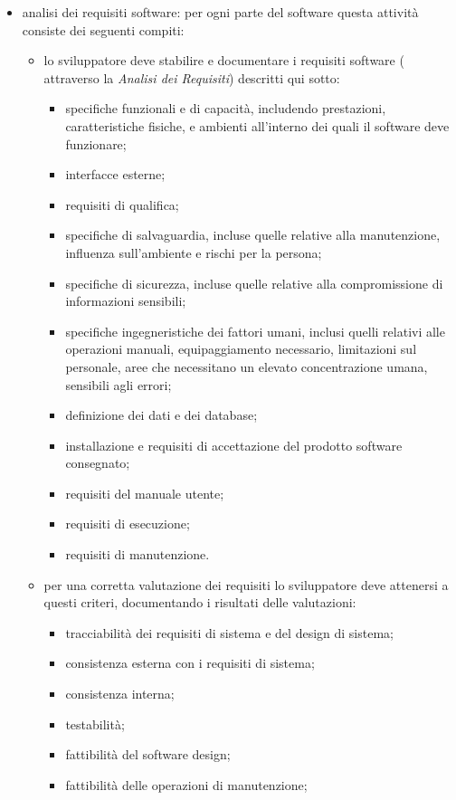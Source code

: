 			\begin{itemize}
			\item analisi dei requisiti software: per ogni parte del software questa attività consiste dei seguenti compiti:
			\begin{itemize}
			\item lo sviluppatore deve stabilire e documentare i requisiti software ( attraverso la \textit{Analisi dei Requisiti}) descritti qui sotto:
			\begin{itemize}
			\item specifiche funzionali e di capacità, includendo prestazioni, caratteristiche fisiche, e ambienti all'interno dei quali il software deve funzionare;
			\item interfacce esterne;
			\item requisiti di qualifica;
			\item specifiche di salvaguardia, incluse quelle relative alla manutenzione, influenza sull'ambiente e rischi per la persona;
			\item specifiche di sicurezza, incluse quelle relative alla compromissione di informazioni sensibili;
			\item specifiche ingegneristiche dei fattori umani, inclusi quelli relativi alle operazioni manuali, equipaggiamento necessario, limitazioni sul personale, aree che necessitano un elevato concentrazione umana, sensibili agli errori;
			\item definizione dei dati e dei database;
			\item installazione e requisiti di accettazione del prodotto software consegnato; 
			\item requisiti del manuale utente;
			\item requisiti di esecuzione;
			\item requisiti di manutenzione.
			\end{itemize}
			\item per una corretta valutazione dei requisiti lo sviluppatore deve attenersi a questi criteri, documentando i risultati delle valutazioni:
			\begin{itemize}
			\item tracciabilità dei requisiti di sistema e del design di sistema;
			\item consistenza esterna con i requisiti di sistema;
			\item consistenza interna;
			\item testabilità;
			\item fattibilità del software design;
			\item fattibilità delle operazioni di manutenzione;
			\end{itemize}
			\end{itemize}
			\end{itemize}
